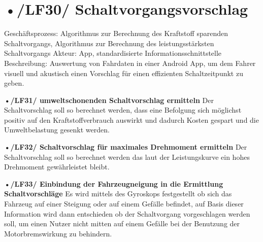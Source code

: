 \section{•/LF30/ Schaltvorgangsvorschlag}
Geschäftsprozess:	Algorithmus zur Berechnung des Kraftstoff sparenden Schaltvorgangs, Algorithmus zur Berechnung des leistungsstärksten Schaltvorgangs
Akteur:			App, standardisierte Informationsschnittstelle
Beschreibung:	Auswertung von Fahrdaten in einer Android App, um dem Fahrer visuell und akustisch einen Vorschlag für einen effizienten Schaltzeitpunkt zu geben. 

\textbf{•/LF31/ umweltschonenden Schaltvorschlag ermitteln}
Der Schaltvorschlag soll so berechnet werden, dass eine Befolgung sich möglichst positiv auf den Kraftstoffverbrauch auswirkt und dadurch Kosten gespart und die Umweltbelastung gesenkt werden.

\textbf{•/LF32/ Schaltvorschlag für maximales Drehmoment ermitteln}
Der Schaltvorschlag soll so berechnet werden das laut der Leistungskurve ein hohes Drehmoment gewährleistet bleibt. 

\textbf{•/LF33/ Einbindung der Fahrzeugneigung in die Ermittlung Schaltvorschläge }
Es wird mittels des Gyroskops festgestellt ob sich das Fahrzeug auf einer Steigung oder auf einem Gefälle befindet, auf Basis dieser Information wird dann entschieden ob der Schaltvorgang vorgeschlagen werden soll, um einen Nutzer nicht mitten auf einem Gefälle bei der Benutzung der Motorbremswirkung zu behindern. 

